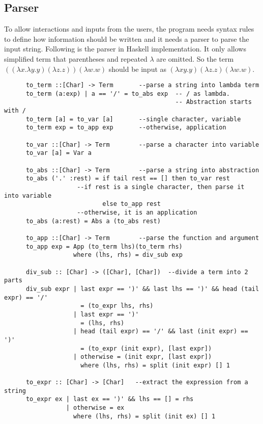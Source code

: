 \subsection{Parser}

To allow interactions and inputs from the users, the program needs syntax rules to define how information should be written and it needs a parser to parse the input string. Following is the parser in Haskell implementation. It only allows simplified term that parentheses and repeated $\lambda$ are omitted. So the term $((\lambda x.\lambda y.y)(\lambda z.z))(\lambda w.w)$ should be input as $(\lambda xy.y)(\lambda z.z)(\lambda w.w)$.  

\begin{verbatim}
      to_term ::[Char] -> Term       --parse a string into lambda term
      to_term (a:exp) | a == '/' = to_abs exp  -- / as lambda. 
                                               -- Abstraction starts with /
      to_term [a] = to_var [a]       --single character, variable   
      to_term exp = to_app exp       --otherwise, application

      to_var ::[Char] -> Term        --parse a character into variable
      to_var [a] = Var a

      to_abs ::[Char] -> Term        --parse a string into abstraction
      to_abs ('.' :rest) = if tail rest == [] then to_var rest 
                    --if rest is a single character, then parse it into variable
                           else to_app rest
                    --otherwise, it is an application
      to_abs (a:rest) = Abs a (to_abs rest)
        
      to_app ::[Char] -> Term        --parse the function and argument       
      to_app exp = App (to_term lhs)(to_term rhs) 
                   where (lhs, rhs) = div_sub exp

      div_sub :: [Char] -> ([Char], [Char])  --divide a term into 2 parts
      div_sub expr | last expr == ')' && last lhs == ')' && head (tail expr) == '/'
                     = (to_expr lhs, rhs)  
                   | last expr == ')'       
                     = (lhs, rhs)
                   | head (tail expr) == '/' && last (init expr) == ')' 
                     = (to_expr (init expr), [last expr])
                   | otherwise = (init expr, [last expr])   
                     where (lhs, rhs) = split (init expr) [] 1

      to_expr :: [Char] -> [Char]   --extract the expression from a string
      to_expr ex | last ex == ')' && lhs == [] = rhs
                 | otherwise = ex
                   where (lhs, rhs) = split (init ex) [] 1


\end{verbatim}
